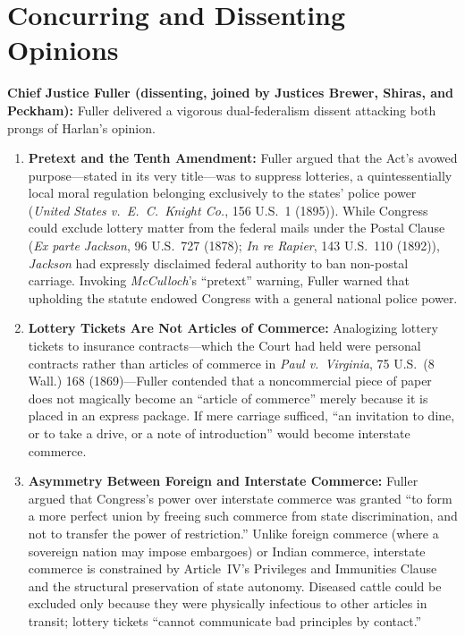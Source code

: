 \documentclass[12pt]{article}
\begin{document}
\section{Concurring and Dissenting Opinions}
\textbf{Chief Justice Fuller (dissenting, joined by Justices Brewer, Shiras, and Peckham):} Fuller delivered a vigorous dual-federalism dissent attacking both prongs of Harlan's opinion.
\begin{enumerate}
  \item \textbf{Pretext and the Tenth Amendment:} Fuller argued that the Act's avowed purpose---stated in its very title---was to suppress lotteries, a quintessentially local moral regulation belonging exclusively to the states' police power (\textit{United States v.\ E.\ C.\ Knight Co.}, 156 U.S.\ 1 (1895)). While Congress could exclude lottery matter from the federal mails under the Postal Clause (\textit{Ex parte Jackson}, 96 U.S.\ 727 (1878); \textit{In re Rapier}, 143 U.S.\ 110 (1892)), \textit{Jackson} had expressly disclaimed federal authority to ban non-postal carriage. Invoking \textit{McCulloch}'s ``pretext'' warning, Fuller warned that upholding the statute endowed Congress with a general national police power.
  \item \textbf{Lottery Tickets Are Not Articles of Commerce:} Analogizing lottery tickets to insurance contracts---which the Court had held were personal contracts rather than articles of commerce in \textit{Paul v.\ Virginia}, 75 U.S.\ (8 Wall.) 168 (1869)---Fuller contended that a noncommercial piece of paper does not magically become an ``article of commerce'' merely because it is placed in an express package. If mere carriage sufficed, ``an invitation to dine, or to take a drive, or a note of introduction'' would become interstate commerce.
  \item \textbf{Asymmetry Between Foreign and Interstate Commerce:} Fuller argued that Congress's power over interstate commerce was granted ``to form a more perfect union by freeing such commerce from state discrimination, and not to transfer the power of restriction.'' Unlike foreign commerce (where a sovereign nation may impose embargoes) or Indian commerce, interstate commerce is constrained by Article~IV's Privileges and Immunities Clause and the structural preservation of state autonomy. Diseased cattle could be excluded only because they were physically infectious to other articles in transit; lottery tickets ``cannot communicate bad principles by contact.''
\end{enumerate}
\end{document}
